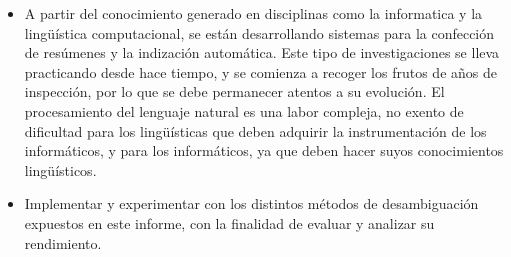\begin{itemize}

  \item  A partir del conocimiento generado en disciplinas como la informatica y la lingüística computacional, se están desarrollando sistemas para la confección de resúmenes y la indización automática. Este tipo de investigaciones se lleva practicando desde hace tiempo, y se comienza a recoger los frutos de años de inspección, por lo que se debe permanecer atentos a su evolución. El procesamiento del lenguaje natural es una labor
compleja, no exento de dificultad para los lingüísticas que deben adquirir la instrumentación de los informáticos, y para los informáticos, ya que deben hacer suyos
conocimientos lingüísticos.

\item Implementar y experimentar con los distintos métodos de desambiguación expuestos en este informe, con la finalidad de evaluar y analizar su rendimiento.
\end{itemize}